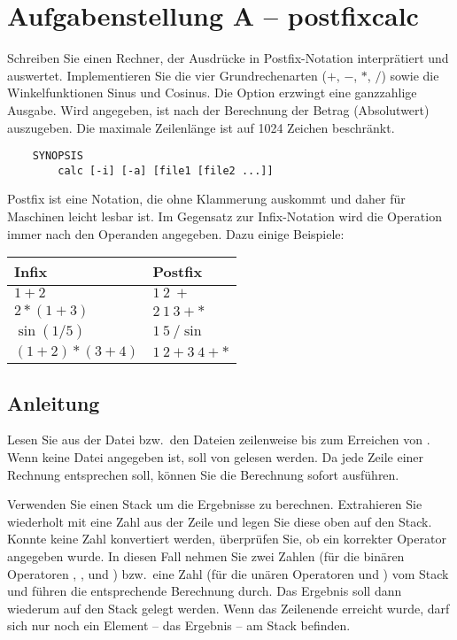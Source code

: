 




\section*{Aufgabenstellung A -- postfixcalc}
Schreiben Sie einen Rechner, der Ausdr{\"u}cke in Postfix-Notation interpr{\"a}tiert
und auswertet.
Implementieren Sie die vier Grundrechenarten (\(+\), \(-\), \(*\), \(/\)) sowie
die Winkelfunktionen Sinus und Cosinus. Die Option  erzwingt eine
ganzzahlige Ausgabe. Wird  angegeben, ist nach der Berechnung der
Betrag (Absolutwert) auszugeben. Die maximale Zeilenlänge ist auf 1024 Zeichen
beschränkt.

\begin{verbatim}
    SYNOPSIS
        calc [-i] [-a] [file1 [file2 ...]]
\end{verbatim}

Postfix ist eine Notation, die ohne Klammerung auskommt und daher für Maschinen
leicht lesbar ist. Im Gegensatz zur Infix-Notation wird die Operation immer nach
den Operanden angegeben. Dazu einige Beispiele:

\begin{tabular}{ll}
\toprule
Infix           & Postfix \\
\midrule
\(1+2\)         & \(1 \: 2 \: +\) \\
\(2*(1+3)\)     & \(2 \: 1 \: 3 + *\) \\
\(\sin(1/5)\)   & \(1 \: 5 \: / \sin\) \\
\((1+2)*(3+4)\) & \(1\:2 + 3\:4 + *\) \\
\bottomrule
\end{tabular}

\subsection*{Anleitung}
Lesen Sie aus der Datei bzw.\ den Dateien zeilenweise bis zum Erreichen von
. Wenn keine Datei angegeben ist, soll von 
gelesen werden. Da jede Zeile einer Rechnung entsprechen soll, können Sie die
Berechnung sofort ausführen.

Verwenden Sie einen Stack um die Ergebnisse zu berechnen. Extrahieren Sie
wiederholt mit  eine Zahl aus der Zeile und legen Sie
diese oben auf den Stack. Konnte keine Zahl konvertiert werden, überprüfen Sie,
ob ein korrekter Operator angegeben wurde. In diesen Fall nehmen Sie zwei Zahlen
(für die binären Operatoren \osueinput{+}, \osueinput{-}, \osueinput{/} und
\osueinput{*}) bzw.\ eine Zahl (für die unären Operatoren  und
) vom Stack und führen die entsprechende Berechnung durch. Das
Ergebnis soll dann wiederum auf den Stack gelegt werden.
Wenn das Zeilenende erreicht wurde, darf sich nur noch ein Element -- das
Ergebnis -- am Stack befinden.

